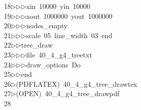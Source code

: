 \begin{tabbing}
18\>$\triangleright$\>$\triangleright$\>$\triangleright$\>xin\ 10000\ yin\ 10000\ \\[0pt]
19\>$\triangleright$\>$\triangleright$\>$\triangleright$\>xout\ 1000000\ yout\ 1000000\ \\[0pt]
20\>$\triangleright$\>$\triangleright$\>$\triangleright$\>nodes\_empty\ \\[0pt]
21\>$\triangleright$\>$\triangleright$\>$\triangleright$\>scale\ 05\ line\_width\ 03\ end\ \\[0pt]
22\>$\triangleright$\>$\triangleright$\>tree\_draw\ \\[0pt]
23\>$\triangleright$\>$\triangleright$\>$\triangleright$\>file\ 40\_4\_g4\_treetxt\ \\[0pt]
24\>$\triangleright$\>$\triangleright$\>$\triangleright$\>draw\_options\ Do\ \\[0pt]
25\>$\triangleright$\>$\triangleright$\>end\ \\[0pt]
26\>$\triangleright$\>(PDFLATEX)\ 40\_4\_g4\_tree\_drawtex\\[0pt]
27\>$\triangleright$\>(OPEN)\ 40\_4\_g4\_tree\_drawpdf\\[0pt]
28\>\end{tabbing}
